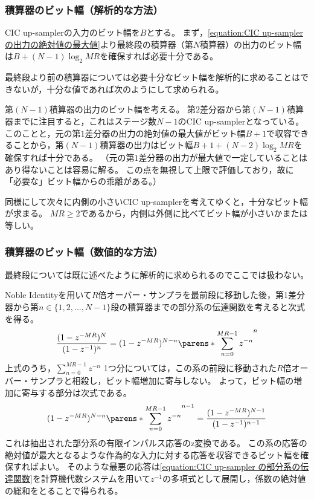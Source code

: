         \subsubsection{積算器のビット幅（解析的な方法）}
            CIC up-samplerの入力のビット幅を$B$とする。
            まず，\cref{equation:CIC up-sampler の出力の絶対値の最大値}より最終段の積算器（第$N$積算器）の出力のビット幅は$B + (N-1)\log_2 MR$を確保すれば必要十分である。
            \par
            最終段より前の積算器については必要十分なビット幅を解析的に求めることはできないが，十分な値であれば次のようにして求められる。
            \par
            第$(N-1)$積算器の出力のビット幅を考える。
            第$2$差分器から第$(N-1)$積算器までに注目すると，これはステージ数$N-1$のCIC up-samplerとなっている。
            このことと，元の第$1$差分器の出力の絶対値の最大値がビット幅$B+1$で収容できることから，第$(N-1)$積算器の出力はビット幅$B + 1 + (N-2)\log_2 MR$を確保すれば十分である。
            （元の第$1$差分器の出力が最大値で一定していることはあり得ないことは容易に解る。
            この点を無視して上限で評価しており，故に「必要な」ビット幅からの乖離がある。）
            \par
            同様にして次々に内側の小さいCIC up-samplerを考えてゆくと，十分なビット幅が求まる。
            $MR\geq 2$であるから，内側は外側に比べてビット幅が小さいかまたは等しい。
        \subsubsection{積算器のビット幅（数値的な方法）}
            最終段については既に述べたように解析的に求められるのでここでは扱わない。
            \par
            Noble Identityを用いて$R$倍オーバー・サンプラを最前段に移動した後，第1差分器から第$n\in\{1,2,...,N-1\}$段の積算器までの部分系の伝達関数を考えると次式を得る。
            \[ \frac{(1-z^{-MR})^N}{(1-z^{-1})^n} = (1-z^{-MR})^{N-n}\parens*{\sum_{n=0}^{MR-1} z^{-n}}^n \]
            上式のうち，$\sum_{n=0}^{MR-1} z^{-n}$ 1つ分については，この系の前段に移動された$R$倍オーバー・サンプラと相殺し，ビット幅増加に寄与しない。
            よって，ビット幅の増加に寄与する部分は次式である。
            \begin{equation}
                (1-z^{-MR})^{N-n}\parens*{\sum_{n=0}^{MR-1} z^{-n}}^{n-1} = \frac{(1-z^{-MR})^{N-1}}{(1-z^{-1})^{n-1}} \label{equation:CIC up-sampler の部分系の伝達関数}
            \end{equation}
            これは抽出された部分系の有限インパルス応答のz変換である。
            この系の応答の絶対値が最大となるような作為的な入力に対する応答を収容できるビット幅を確保すればよい。
            そのような最悪の応答は\cref{equation:CIC up-sampler の部分系の伝達関数}を計算機代数システムを用いて$z^{-1}$の多項式として展開し，係数の絶対値の総和をとることで得られる。
